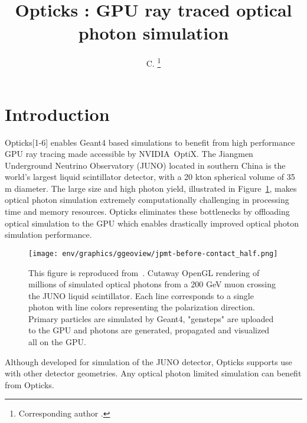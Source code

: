 \documentclass{webofc}
\begin{document}
\title{Opticks : GPU ray traced optical photon simulation}
\author{ C. \fnsep\thanks{Corresponding author .}}
\abstract{}
\maketitle
%
\section{Introduction}%
\label{intro}
%
Opticks[1-6] enables Geant4\cite{g4} based simulations 
to benefit from high performance GPU ray tracing made accessible 
by NVIDIA\textregistered\ OptiX\texttrademark\cite{optix}.
%
The Jiangmen Underground Neutrino Observatory (JUNO)\cite{juno} 
located in southern China is the world's largest liquid scintillator detector, 
with a 20 kton spherical volume of 35 m diameter. The large size and high photon yield, illustrated in Figure~\ref{problem}, 
makes optical photon simulation extremely computationally challenging in processing time and memory resources. 
Opticks eliminates these bottlenecks by offloading optical simulation to the GPU which
enables drastically improved optical photon simulation performance.
%
\begin{figure}
\centering
\texttt{[image: env/graphics/ggeoview/jpmt-before-contact\_half.png]}
\caption{
This figure is reproduced from~\cite{chep2019}. Cutaway OpenGL rendering of millions of simulated optical photons from a 200 GeV muon crossing the JUNO liquid scintillator. 
Each line corresponds to a single photon with line colors representing the polarization direction. 
Primary particles are simulated by Geant4, "gensteps" are uploaded to the GPU and photons are generated, propagated
and visualized all on the GPU. 
}
\label{problem}
\vspace{-5mm}
\end{figure}%
%
%
Although developed for simulation of the JUNO detector, Opticks
supports use with other detector geometries. 
Any optical photon limited simulation can benefit from Opticks.
\end{document}
